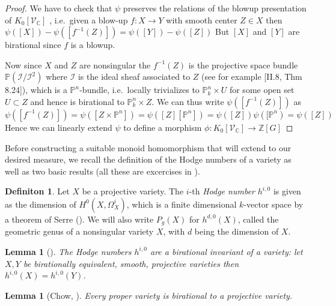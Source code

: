 \documentclass[11pt, a4paper, german]{article}
\theoremstyle{plain}
\newtheorem{lemma}[theorem]{Lemma}
\theoremstyle{definition}
\newtheorem{definition}[theorem]{Definiton}
\newcommand{\gring}[1][k]{K_0[\mathcal{V}_#1]}
\begin{document}
\begin{proof}
    We have to check that $\psi$ preserves the relations of the blowup presentation of $\gring[\mathbb{C}]$
    , i.e.\ given a blow-up $f \colon X \to Y$ with smooth center $Z \in X$ then $\psi([X]) - \psi([f^{-1}(Z)]) = \psi([Y]) - \psi([Z])$  
    But $[X]$ and $[Y]$ are birational since $f$ is a blowup.
    
    Now since $X$ and $Z$ are nonsingular the $f^{-1}(Z)$ is the projective space bundle  $\mathbb{P}(\mathcal{I}/\mathcal{I}^2)$ 
    where $\mathcal{I}$ is the ideal sheaf associated to $Z$ (see for example \cite{Ha}[II.8, Thm 8.24]),
    which is a $\mathbb{P}^n$-bundle, i.e.\ locally trivializes to $\mathbb{P}_k^n \times U$ for some open set $U \subset Z$
    and hence is birational to $\mathbb{P}_k^n \times Z$. 
    We can thus write $\psi([f^{-1}(Z)])$ as  
    \[
        \psi([f^{-1}(Z)]) = \psi([Z \times \mathbb{P}^n]) = \psi([Z][\mathbb{P}^n]) = \psi([Z])\psi([\mathbb{P}^n) = \psi([Z])
    \]
    Hence we can linearly extend $\psi$ to define a morphism $\phi \colon \gring[\mathbb{C}] \to \mathbb{Z} [G]$
\end{proof}

Before constructing a suitable monoid homomorphism that will extend to our desired measure, we recall the definition of the Hodge numbers
of a variety as well as two basic results (all these are excercises in \cite[Ch. II]{Ha}).

\begin{definition}
    Let $X$ be a projective variety. The $i$-th \emph{Hodge number} $h^{i,0}$ is given as the dimension of $H^0(X,\Omega^i_X)$, 
    which is a finite dimensional $k$-vector space by a theorem of Serre (\cite[§3 Prop. 7]{FAC}).
    We will also write $P_g(X)$ for $h^{d,0}(X)$, called the geometric genus of a nonsingular variety $X$, with $d$ being the dimension of $X$.
\end{definition}

\begin{lemma}[{\cite[II Ex. 8.8]{Ha}}]
    \label{bir}
    The Hodge numbers $h^{i,0}$ are a birational invariant of a variety: let $X, Y$ be birationally equivalent, smooth, projective varieties
    then $h^{i,0}(X) = h^{i,0}(Y)$.
\end{lemma}

\begin{lemma}[Chow, {\cite[II Ex. 4.10]{Ha}}]
    Every proper variety is birational to a projective variety.
\end{lemma}
\end{document}
